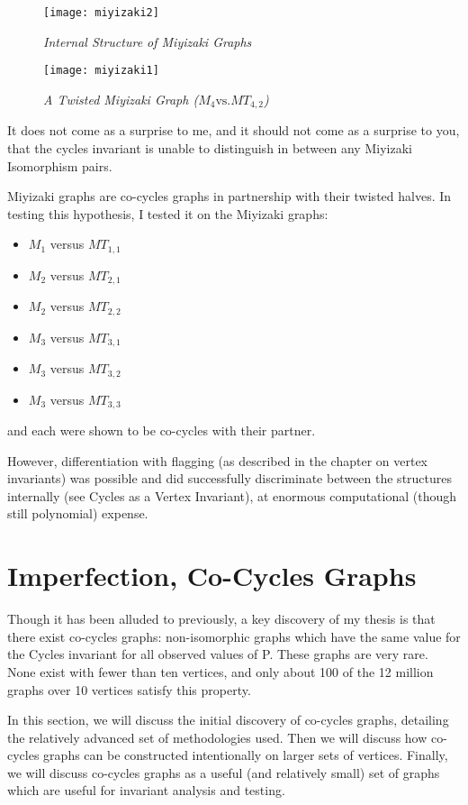 \begin{figure}[h]
\label{fig:miyizaki2}
\caption{\emph{Internal Structure of Miyizaki Graphs}}
\centering
\texttt{[image: miyizaki2]}
\end{figure}

\begin{figure}[h]
\label{fig:miyizaki1}
\caption{\emph{A Twisted Miyizaki Graph ($M_4 \text{vs.} MT_{4,2}$)}}
\centering
\texttt{[image: miyizaki1]}
\end{figure}

It does not come as a surprise to me, and it should not come as a surprise to you, that the cycles invariant is unable to distinguish in between any Miyizaki Isomorphism pairs.

Miyizaki graphs are co-cycles graphs in partnership with their twisted halves.
In testing this hypothesis, I tested it on the Miyizaki graphs:
\begin{itemize}
\item{$M_1$ versus $MT_{1,1}$}
\item{$M_2$ versus $MT_{2,1}$}
\item{$M_2$ versus $MT_{2,2}$}
\item{$M_3$ versus $MT_{3,1}$}
\item{$M_3$ versus $MT_{3,2}$}
\item{$M_3$ versus $MT_{3,3}$}
\end{itemize}
and each were shown to be co-cycles with their partner.

However, differentiation with flagging (as described in the chapter on vertex invariants) was possible and did successfully discriminate between the structures internally (see Cycles as a Vertex Invariant), at enormous computational (though still polynomial) expense.

\section{Imperfection, Co-Cycles Graphs}

Though it has been alluded to previously, a key discovery of my thesis is that there exist co-cycles graphs: non-isomorphic graphs which have the same value for the Cycles invariant for all observed values of P.
These graphs are very rare.
None exist with fewer than ten vertices, and only about 100 of the 12 million graphs over 10 vertices satisfy this property.

In this section, we will discuss the initial discovery of co-cycles graphs, detailing the relatively advanced set of methodologies used.
Then we will discuss how co-cycles graphs can be constructed intentionally on larger sets of vertices.
Finally, we will discuss co-cycles graphs as a useful (and relatively small) set of graphs which are useful for invariant analysis and testing.

